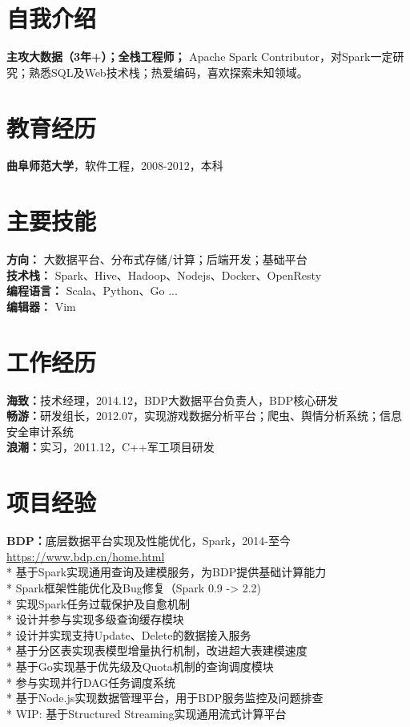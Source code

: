 \documentclass[UTF8,margin,line]{res}
\begin{document}

\begin{resume}

\section{\sc 自我介绍}
\textbf{主攻大数据（3年+）；全栈工程师；} Apache Spark Contributor，对Spark一定研究；熟悉SQL及Web技术栈；热爱编码，喜欢探索未知领域。

\section{\sc 教育经历}
\textbf{曲阜师范大学}，软件工程，2008-2012，本科

\section{\sc 主要技能}
\textbf{方向：} 大数据平台、分布式存储/计算；后端开发；基础平台 \\
\textbf{技术栈：} Spark、Hive、Hadoop、Nodejs、Docker、OpenResty \\
\textbf{编程语言：} Scala、Python、Go ... \\
\textbf{编辑器：} Vim

\section{\sc 工作经历}
\textbf{海致：}技术经理，2014.12，BDP大数据平台负责人，BDP核心研发 \\
\textbf{畅游：}研发组长，2012.07，实现游戏数据分析平台；爬虫、舆情分析系统；信息安全审计系统 \\
\textbf{浪潮：}实习，2011.12，C++军工项目研发

\section{\sc 项目经验}
\textbf{BDP：}底层数据平台实现及性能优化，Spark，2014-至今 \url{https://www.bdp.cn/home.html} \\
* 基于Spark实现通用查询及建模服务，为BDP提供基础计算能力 \\
* Spark框架性能优化及Bug修复（Spark 0.9 -> 2.2) \\
* 实现Spark任务过载保护及自愈机制 \\
* 设计并参与实现多级查询缓存模块 \\
* 设计并实现支持Update、Delete的数据接入服务 \\
* 基于分区表实现表模型增量执行机制，改进超大表建模速度 \\
* 基于Go实现基于优先级及Quota机制的查询调度模块 \\
* 参与实现并行DAG任务调度系统 \\
* 基于Node.js实现数据管理平台，用于BDP服务监控及问题排查 \\
* WIP: 基于Structured Streaming实现通用流式计算平台 \\


\end{resume}
\end{document}
